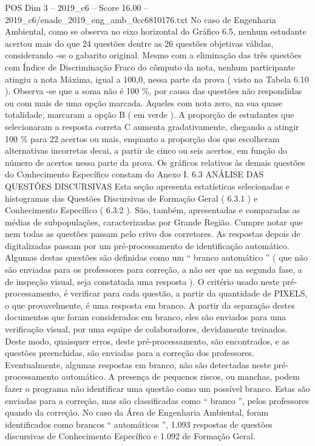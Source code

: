 \begin{textsample}{POS Dim 3 – 2019\_c6 – Score 16.00 – 2019\_c6/enade\_2019\_eng\_amb\_0cc6810176.txt}
No caso de Engenharia Ambiental, como se observa no eixo horizontal do Gráfico 6.5, nenhum estudante acertou mais do que 24 questões dentre as 26 questões objetivas válidas, considerando -se o gabarito original.
Mesmo com a eliminação das três questões com Índice de Discriminação Fraco do cômputo da nota, nenhum participante atingiu a nota Máxima, igual a 100,0, nessa parte da prova ( visto na Tabela 6.10 ).
Observa -se que a soma não é 100 \%, por causa das questões não respondidas ou com mais de uma opção marcada.
Aqueles com nota zero, na sua quase totalidade, marcaram a opção B ( em verde ).
A proporção de estudantes que selecionaram a resposta correta C aumenta gradativamente, chegando a atingir 100 \% para 22 acertos ou mais, enquanto a proporção dos que escolheram alternativas incorretas decai, a partir de cinco ou seis acertos, em função do número de acertos nessa parte da prova.
Os gráficos relativos às demais questões do Conhecimento Específico constam do Anexo I. 6.3 ANÁLISE DAS QUESTÕES DISCURSIVAS Esta seção apresenta estatísticas selecionadas e histogramas das Questões Discursivas de Formação Geral ( 6.3.1 ) e Conhecimento Específico ( 6.3.2 ).
São, também, apresentadas e comparadas as médias de subpopulações, caracterizadas por Grande Região.
Cumpre notar que nem todas as questões passam pelo crivo dos corretores.
As respostas depois de digitalizadas passam por um pré-processamento de identificação automático.
Algumas destas questões são definidas como um “ branco automático ” ( que não são enviadas para os professores para correção, a não ser que na segunda fase, a de inspeção visual, seja constatada uma resposta ).
O critério usado neste pré-processamento, é verificar para cada questão, a partir da quantidade de PIXELS, o que provavelmente, é uma resposta em branco.
A partir da separação destes documentos que foram considerados em branco, eles são enviados para uma verificação visual, por uma equipe de colaboradores, devidamente treinados.
Deste modo, quaisquer erros, deste pré-processamento, são encontrados, e as questões preenchidas, são enviadas para a correção dos professores.
Eventualmente, algumas respostas em branco, não são detectadas neste pré-processamento automático.
A presença de pequenos riscos, ou manchas, podem fazer o programa não identificar uma questão como um possível branco.
Estas são enviadas para a correção, mas são classificadas como “ branco ”, pelos professores quando da correção.
No caso da Área de Engenharia Ambiental, foram identificados como brancos “ automáticos ”, 1.093 respostas de questões discursivas de Conhecimento Específico e 1.092 de Formação Geral.

\end{textsample}
